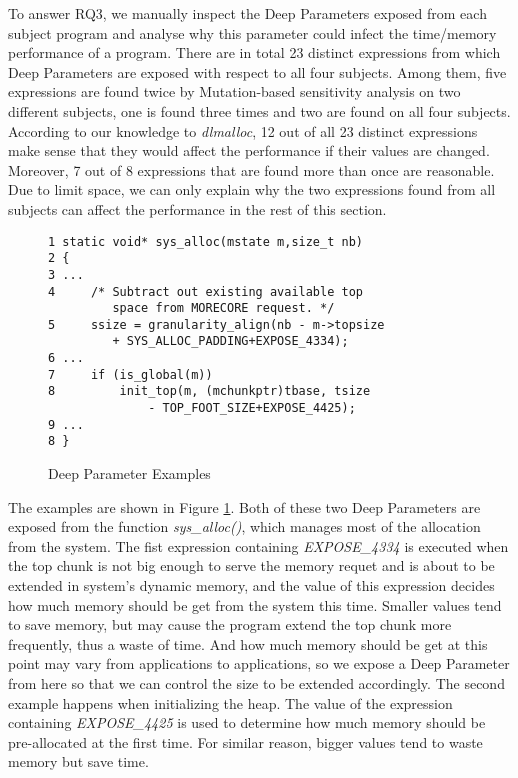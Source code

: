 To answer RQ3, we manually inspect the Deep Parameters exposed from each subject program and analyse why this parameter could infect the time/memory performance of a program. There are in total 23 distinct expressions from which Deep Parameters are exposed with respect to all four subjects. Among them, five expressions are found twice by Mutation-based sensitivity analysis on two different subjects, one is found three times and two are found on all four subjects. According to our knowledge to \emph{dlmalloc}, 12 out of all 23 distinct expressions make sense that they would affect the performance if their values are changed. Moreover, 7 out of 8 expressions that are found more than once are reasonable. Due to limit space, we can only explain why the two expressions found from all subjects can affect the performance in the rest of this section.

\begin{figure}[ht]
\begin{lstlisting}
1 static void* sys_alloc(mstate m,size_t nb) 
2 {
3 ...
4     /* Subtract out existing available top 
         space from MORECORE request. */
5     ssize = granularity_align(nb - m->topsize
         + SYS_ALLOC_PADDING+EXPOSE_4334);
6 ...
7     if (is_global(m))
8         init_top(m, (mchunkptr)tbase, tsize
              - TOP_FOOT_SIZE+EXPOSE_4425);
9 ...
8 }

\end{lstlisting}
\label{deep_parameter}
\caption{Deep Parameter Examples}
\end{figure}

The examples are shown in Figure \ref{deep_parameter}. Both of these two Deep Parameters are exposed from the function \emph{sys\_alloc()}, which manages most of the allocation from the system. The fist expression containing \emph{EXPOSE\_4334} is executed when the top chunk is not big enough to serve the memory requet and is about to be extended in system's dynamic memory, and the value of this expression decides how much memory should be get from the system this time. Smaller values tend to save memory, but may cause the program extend the top chunk more frequently, thus a waste of time. And how much memory should be get at this point may vary from applications to applications, so we expose a Deep Parameter from here so that we can control the size to be extended accordingly. The second example happens when initializing the heap. The value of the expression containing \emph{EXPOSE\_4425} is used to determine how much memory should be pre-allocated at the first time. For similar reason, bigger values tend to waste memory but save time.


